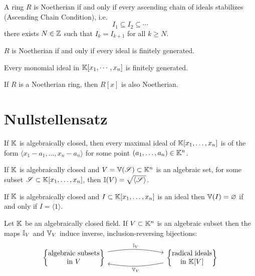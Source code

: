 \documentclass[12pt]{amsart}
\begin{document}
\begin{definition}
    A ring $R$ is Noetherian if and only if every ascending chain of ideals stabilizes (Ascending Chain Condition), i.e. 
    \[I_1 \subseteq I_2 \subseteq \cdots\]
    there exists $N \in \mathbb Z$ such that $I_k = I_{k+1}$ for all $k \geq N$. 
\end{definition}

\begin{lemma}
    $R$ is Noetherian if and only if every ideal is finitely generated. 
\end{lemma}

\begin{lemma}
    Every monomial ideal in $\mathbb K[x_1, \cdots, x_n]$ is finitely generated. 
\end{lemma}

\begin{theorem}
    If $R$ is a Noetherian ring, then $R[x]$ is also Noetherian. 
\end{theorem}

\section{Nullstellensatz}

\begin{theorem} If $\mathbb K$ is algebraically closed, then every maximal ideal of $\mathbb K[x_1,\ldots,x_n]$ is of the form $\langle x_1-a_1,\ldots,x_n-a_n\rangle$ for some point $(a_1,\ldots,a_n) \in \mathbb K^n$.
\end{theorem}  

\begin{theorem} If $\mathbb K$ is algebraically closed and $V = \mathbb V(\operatorname{\mathscr S}) \subset \mathbb K^n$ is an algebraic set, for some subset $\operatorname{\mathscr S} \subset \mathbb K[x_1,\ldots,x_n]$, then $\mathbb I(V) = \sqrt{\langle \operatorname{\mathscr S} \rangle}$. 
\end{theorem}  

\begin{theorem} If $\mathbb K$ is algebraically closed and $I\subset \mathbb K[x_1,\ldots,x_n]$ is an ideal then $\mathbb V(I)=\varnothing$ if and only if $I = \langle 1 \rangle$.
\end{theorem}

\begin{theorem} Let $\mathbb K$ be an algebraically closed field. If $V \subset \mathbb K^n$ is an algebraic subset then the maps $\mathbb I_V$ and $\mathbb V_V$ induce inverse, inclusion-reversing bijections:
 \[
\begin{tikzcd}[row sep = .5 em, column sep = 8em]
\left\{ \begin{matrix} 
\text{algebraic subsets} \\
\text{in $V$}
\end{matrix} \right\} \arrow[r, bend left=10, "\I_V"] & \arrow[l,bend left=10,"\V_V"]
\left\{ \begin{matrix} 
\text{radical ideals} \\
\text{in $\K[V]$}
\end{matrix} \right\} 
\end{tikzcd}
\]
\end{theorem}
\end{document}
